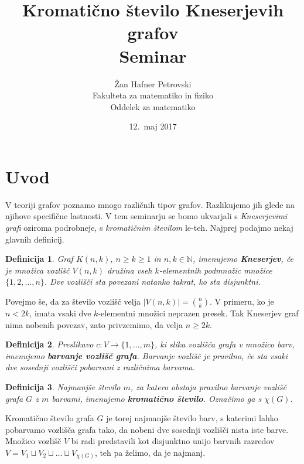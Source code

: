\documentclass[a4paper,12pt]{article}
\title{Kromatično število Kneserjevih grafov \\ 
\Large Seminar}
\author{Žan Hafner Petrovski \\
Fakulteta za matematiko in fiziko \\
Oddelek za matematiko}
\date{12.\ maj 2017}
\newtheorem{definicija}{Definicija}
\begin{document}
 
\maketitle
\newpage


\section{Uvod}

V teoriji grafov poznamo mnogo različnih tipov grafov. Razlikujemo jih glede na njihove specifične lastnosti. V tem seminarju se bomo ukvarjali s {\em Kneserjevimi grafi} oziroma podrobneje, s {\em kromatičnim številom} le-teh. Najprej podajmo nekaj glavnih definicij.


\begin{definicija}
Graf $K(n,k)$, $n \geq k \geq 1$ in $n, k \in \mathbb{N}$, imenujemo \mbox{\textbf{Kneserjev}}, če je množica vozlišč $V(n,k)$ družina vseh $k$-elementnih podmnožic množice $\{1, 2, \ldots, n\}$. Dve vozlišči sta povezani natanko takrat, ko sta disjunktni. 
\end{definicija}

Povejmo še, da za število vozlišč velja $|V(n,k)|={{n}\choose{k}}$. V primeru, ko je $n < 2k$, imata vsaki dve $k$-elementni množici neprazen presek. Tak Kneserjev graf nima nobenih povezav, zato privzemimo, da velja $n \geq 2k$.

\begin{definicija}
Preslikavo $c: V \rightarrow \{1, \ldots, m\}$, ki slika vozlišča grafa v množico barv, imenujemo \textbf {barvanje vozlišč grafa}. Barvanje vozlišč je pravilno, če sta vsaki dve sosednji vozlišči pobarvani z različnima barvama.
\end{definicija}

\begin{definicija}
Najmanjše število $m$, za katero obstaja pravilno barvanje vozlišč grafa $G$ z $m$ barvami, imenujemo \textbf {kromatično število}. Označimo ga s $\chi(G).$
\end{definicija}

Kromatično število grafa $G$ je torej najmanjše število barv, s katerimi lahko pobarvamo vozlišča grafa tako, da nobeni dve sosednji vozlišči nista iste barve. Množico vozlišč $V$ bi radi predstavili kot disjunktno unijo barvnih razredov $V = V_1 \sqcup V_2 \sqcup \ldots \sqcup V_{\chi(G)}$, teh pa želimo, da je najmanj. 
\end{document}
